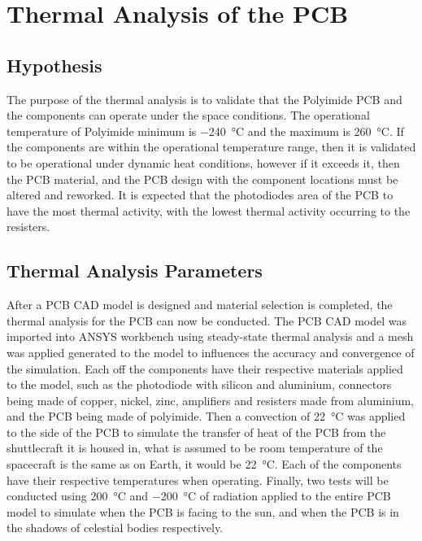 \section{Thermal Analysis of the PCB}

\subsection{Hypothesis}
The purpose of the thermal analysis is to validate that the Polyimide
PCB and the components can operate under the space conditions. The
operational temperature of Polyimide minimum is \SI{-240}{\celsius} and the maximum
is \SI{260}{\celsius}. If the components are within the operational temperature
range, then it is validated to be operational under dynamic heat
conditions, however if it exceeds it, then the PCB material, and the PCB
design with the component locations must be altered and reworked. It is
expected that the photodiodes area of the PCB to have the most thermal
activity, with the lowest thermal activity occurring to the resisters.

\subsection{Thermal Analysis Parameters}
After a PCB CAD model is designed and material selection is completed,
the thermal analysis for the PCB can now be conducted. The PCB CAD model
was imported into ANSYS workbench using steady-state thermal analysis
and a mesh was applied generated to the model to influences the accuracy
and convergence of the simulation. Each off the components have their
respective materials applied to the model, such as the photodiode with
silicon and aluminium, connectors being made of copper, nickel, zinc,
amplifiers and resisters made from aluminium, and the PCB being made of
polyimide. Then a convection of \SI{22}{\celsius} was applied to the side of the PCB
to simulate the transfer of heat of the PCB from the shuttlecraft it is
housed in, what is assumed to be room temperature of the spacecraft is the same as
on Earth, it would be \SI{22}{\celsius}. Each of the components have their respective
temperatures when operating. Finally, two tests will be conducted using
\SI{200}{\celsius} and \SI{-200}{\celsius} of radiation applied to the entire PCB model to
simulate when the PCB is facing to the sun, and when the PCB is in the
shadows of celestial bodies respectively.

